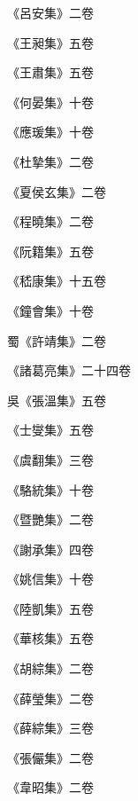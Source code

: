 \begin{pinyinscope}
 《呂安集》二卷



 《王昶集》五卷



 《王肅集》五卷



 《何晏集》十卷



 《應瑗集》十卷



 《杜摯集》二卷



 《夏侯玄集》二卷



 《程曉集》二卷



 《阮籍集》五卷



 《嵇康集》十五卷



 《鐘會集》十卷



 蜀《許靖集》二卷



 《諸葛亮集》二十四卷



 吳《張溫集》五卷



 《士燮集》五卷



 《虞翻集》三卷



 《駱統集》十卷



 《暨艷集》二卷



 《謝承集》四卷



 《姚信集》十卷



 《陸凱集》五卷



 《華核集》五卷



 《胡綜集》二卷



 《薛瑩集》二卷



 《薛綜集》三卷



 《張儼集》二卷



 《韋昭集》二卷




\end{pinyinscope}
